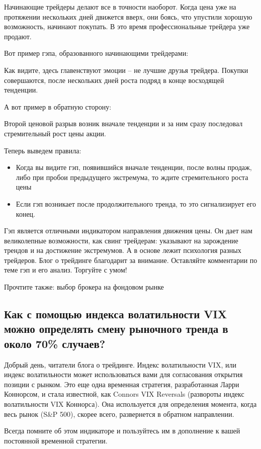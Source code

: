 \documentclass{book}
\begin{document}
Начинающие трейдеры делают все в точности наоборот. Когда цена уже на протяжении нескольких дней движется вверх, они боясь, что упустили хорошую возможность, начинают покупать. В это время профессиональные трейдера уже продают.

Вот пример гэпа, образованного начинающими трейдерами:

Как видите, здесь главенствуют эмоции – не лучшие друзья трейдера. Покупки совершаются, после нескольких дней роста подряд в конце восходящей тенденции.

А вот пример в обратную сторону:

Второй ценовой разрыв возник вначале тенденции и за ним сразу последовал стремительный рост цены акции.

Теперь выведем правила:
\begin{itemize}
\item     Когда вы видите гэп, появившийся вначале тенденции, после волны продаж, либо при пробои предыдущего экстремума, то ждите стремительного роста цены
\item     Если гэп возникает после продолжительного тренда, то это сигнализирует его конец.
\end{itemize}

Гэп является отличными индикатором направления движения цены. Он дает нам великолепные возможности, как свинг трейдерам: указывают на зарождение трендов и на достижение экстремумов. А в основе лежит психология разных трейдеров. Блог о трейдинге благодарит за внимание. Оставляйте комментарии по теме гэп и его анализ. Торгуйте с умом!


Прочтите также: выбор брокера на фондовом рынке

\subsection{Как с помощью индекса волатильности VIX можно определять смену рыночного тренда в около 70\% случаев?}

Добрый день, читатели блога о трейдинге. Индекс волатильности VIX, или индекс волатильности может использоваться вами для согласования открытия позиции с рынком. Это еще одна временная стратегия, разработанная Ларри Коннорсом, и стала известной, как Connors VIX Reversals (развороты индекс волатильности VIX Коннорса). Она используется для определения момента, когда весь рынок (S\&P 500), скорее всего, развернется в обратном направлении.

Всегда помните об этом индикаторе и пользуйтесь им в дополнение к
вашей постоянной временной стратегии.
\end{document}
